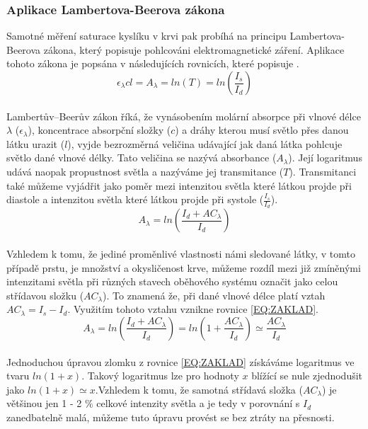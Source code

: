 \subsubsection{Aplikace Lambertova-Beerova zákona} Samotné měření saturace kyslíku v krvi pak probíhá na principu Lambertova-Beerova zákona, který popisuje pohlcováni elektromagnetické záření. Aplikace tohoto zákona je popsána v následujících rovnicích, které popisuje \cite{KYRIACOU}.
\begin{equation}
  {\epsilon_{\lambda}cl} = A_{\lambda} = ln(T) = ln(\frac{I_s}{I_d})
  \label{EQ:Lambertův–Beerův zákon}
\end{equation}\\
Lambertův–Beerův zákon říká, že vynásobením molární absorpce při vlnové délce $\lambda$ ($\epsilon_{\lambda}$), koncentrace absorpční složky ($c$) a dráhy kterou musí světlo přes danou látku urazit ($l$), vyjde bezrozměrná veličina udávající jak daná látka pohlcuje světlo dané vlnové délky. Tato veličina se nazývá absorbance ($A_{\lambda}$). Její logaritmus udává naopak propustnost světla a nazýváme jej transmitance ($T$). Transmitanci také můžeme vyjádřit jako poměr mezi intenzitou světla které látkou projde při diastole a intenzitou světla které látkou projde při systole ($\frac{I_s}{I_d}$).\\
\begin{equation}
    A_{\lambda} = ln(\frac{I_d+AC_{\lambda}}{I_d})
    \label{EQ:ZAKLAD}
\end{equation}\\
Vzhledem k tomu, že jediné proměnlivé vlastnosti námi sledované látky, v tomto případě prstu, je množství a okysličenost krve, můžeme rozdíl mezi již zmíněnými intenzitami světla při různých stavech oběhového systému označit jako celou střídavou složku ($AC_{\lambda}$). To znamená že, při dané vlnové délce platí vztah $AC_{\lambda} = I_s - I_d$. Využitím tohoto vztahu vznikne rovnice \ref{EQ:ZAKLAD}.\\
\begin{equation}
    A_{\lambda} = ln(\frac{I_d+AC_{\lambda}}{I_d}) = ln(1+\frac{AC_{\lambda}}{I_d}) \simeq \frac{AC_{\lambda}}{I_d}
\end{equation}\\
Jednoduchou úpravou zlomku z rovnice \ref{EQ:ZAKLAD} získáváme logaritmus ve tvaru $ln(1+x)$. Takový logaritmus lze pro hodnoty $x$ blížící se nule zjednodušit jako $ln(1+x)\simeq x$.Vzhledem k tomu, že samotná střídavá složka ($AC_{\lambda}$) je většinou jen 1 - 2 \% celkové intenzity světla a je tedy v porovnání s $I_d$ zanedbatelně malá, můžeme tuto úpravu provést se bez ztráty na přesnosti.\\
